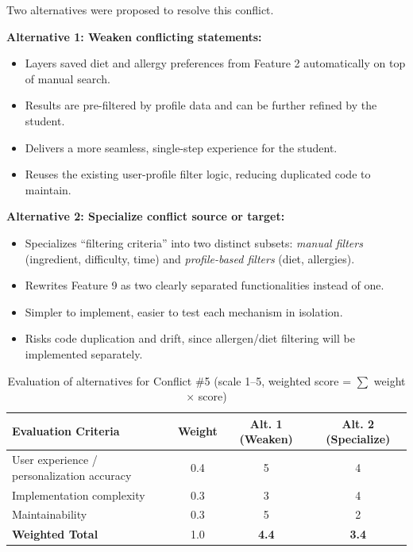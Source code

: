 \documentclass[11pt]{article}
\begin{document}
Two alternatives were proposed to resolve this conflict.

\textbf{Alternative 1: Weaken conflicting statements:}
\begin{itemize}[leftmargin=1.5em]
  \item Layers saved diet and allergy preferences from Feature 2 automatically on top of manual search.
  \item Results are pre-filtered by profile data and can be further refined by the student.
  \item Delivers a more seamless, single-step experience for the student.
  \item Reuses the existing user-profile filter logic, reducing duplicated code to maintain.
\end{itemize}

\textbf{Alternative 2: Specialize conflict source or target:}
\begin{itemize}[leftmargin=1.5em]
  \item Specializes ``filtering criteria'' into two distinct subsets: \textit{manual filters} (ingredient, difficulty, time) and \textit{profile-based filters} (diet, allergies).
  \item Rewrites Feature 9 as two clearly separated functionalities instead of one.
  \item Simpler to implement, easier to test each mechanism in isolation.
  \item Risks code duplication and drift, since allergen/diet filtering will be implemented separately.
\end{itemize}

\begin{table}[H]
\centering
\small
\renewcommand{\arraystretch}{1.3}
\begin{tabular}{|p{4cm}|c|c|c|}
\hline
\textbf{Evaluation Criteria} & \textbf{Weight} & \textbf{Alt. 1 (Weaken)} & \textbf{Alt. 2 (Specialize)} \\
\hline
User experience / personalization accuracy & 0.4 & 5 & 4 \\
\hline
Implementation complexity & 0.3 & 3 & 4 \\
\hline
Maintainability & 0.3 & 5 & 2 \\
\hline
\hline
\textbf{Weighted Total} & 1.0 & \textbf{4.4} & \textbf{3.4} \\
\hline
\end{tabular}
\caption{Evaluation of alternatives for Conflict \#5 (scale 1--5, weighted score = $\sum$ weight $\times$ score)}
\end{table}
\end{document}

